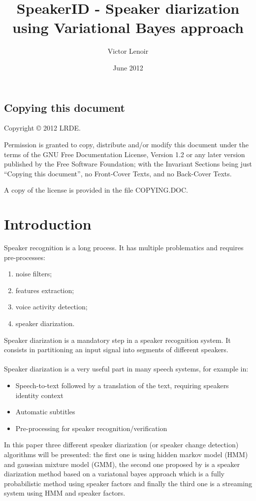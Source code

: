 \documentclass{techrep} %
\title{SpeakerID - Speaker diarization using Variational Bayes approach}
\author{Victor Lenoir} \revision$LastChangedRevision: 2340 $
\date{June 2012} \email{lenoir@lrde.epita.fr}
\begin{document}
\section*{Copying this document}
Copyright \copyright{} 2012 LRDE.

Permission is granted to copy, distribute and/or modify this document under
the terms of the GNU Free Documentation License, Version 1.2 or any later
version published by the Free Software Foundation; with the Invariant Sections
being just ``Copying this document'', no Front-Cover Texts, and no Back-Cover
Texts.

A copy of the license is provided in the file COPYING.DOC.

\tableofcontents

\newpage
\chapter{Introduction}

Speaker recognition is a long process. It has multiple problematics
and requires pre-processes:
\begin{enumerate}
\item noise filters;
\item features extraction;
\item voice activity detection;
\item speaker diarization.
\end{enumerate}

Speaker diarization is a mandatory step in a speaker recognition
system.  It consists in partitioning an input signal into segments of
different speakers.\\\\ Speaker diarization is a very useful part in
many speech systems, for example in:
\begin{itemize}
\item Speech-to-text followed by a translation of the text, requiring
  speakers identity context
\item Automatic subtitles
\item Pre-processing for speaker recognition/verification
\end{itemize}

In this paper three different speaker diarization (or speaker change
detection) algorithms will be presented: the first one is using hidden
markov model (HMM) and gaussian mixture model (GMM), the second one
proposed by \cite{DIAFACT} is a speaker diarization method based on a
variatonal bayes approach which is a fully probabilistic method using
speaker factors and finally the third one is a streaming system using
HMM and speaker factors.
\end{document}

